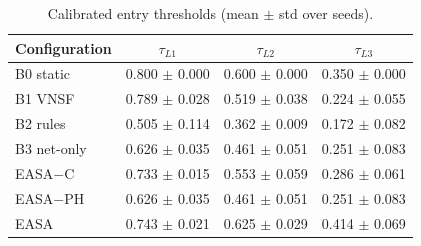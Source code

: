 \begin{table}[H]
\caption{Calibrated entry thresholds (mean $\pm$ std over seeds).}
\label{tab:thresholds}
\centering\footnotesize
\begin{tabular}{lccc}
\toprule
Configuration & $\tau_{L1}$ & $\tau_{L2}$ & $\tau_{L3}$ \\
\midrule
B0 static & 0.800 $\pm$ 0.000 & 0.600 $\pm$ 0.000 & 0.350 $\pm$ 0.000 \\
B1 VNSF & 0.789 $\pm$ 0.028 & 0.519 $\pm$ 0.038 & 0.224 $\pm$ 0.055 \\
B2 rules & 0.505 $\pm$ 0.114 & 0.362 $\pm$ 0.009 & 0.172 $\pm$ 0.082 \\
B3 net-only & 0.626 $\pm$ 0.035 & 0.461 $\pm$ 0.051 & 0.251 $\pm$ 0.083 \\
EASA$-$C & 0.733 $\pm$ 0.015 & 0.553 $\pm$ 0.059 & 0.286 $\pm$ 0.061 \\
EASA$-$PH & 0.626 $\pm$ 0.035 & 0.461 $\pm$ 0.051 & 0.251 $\pm$ 0.083 \\
EASA & 0.743 $\pm$ 0.021 & 0.625 $\pm$ 0.029 & 0.414 $\pm$ 0.069 \\
\bottomrule
\end{tabular}
\end{table}

